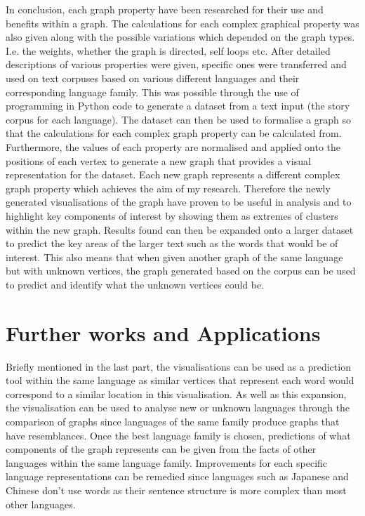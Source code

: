 \noindent In conclusion, each graph property have been researched for their use and benefits within a graph. The calculations for each complex graphical property was also given along with the possible variations which depended on the graph types. I.e. the weights, whether the graph is directed, self loops etc. After detailed descriptions of various properties were given, specific ones were transferred and used on text corpuses based on various different languages and their corresponding language family. This was possible through the use of programming in Python code to generate a dataset from a text input (the story corpus for each language). The dataset can then be used to formalise a graph so that the calculations for each complex graph property can be calculated from. Furthermore, the values of each property are normalised and applied onto the positions of each vertex to generate a new graph that provides a visual representation for the dataset. Each new graph represents a different complex graph property which achieves the aim of my research. Therefore the newly generated visualisations of the graph have proven to be useful in analysis and to highlight key components of interest by showing them as extremes of clusters within the new graph. Results found can then be expanded onto a larger dataset to predict the key areas of the larger text such as the words that would be of interest. This also means that when given another graph of the same language but with unknown vertices, the graph generated based on the corpus can be used to predict and identify what the unknown vertices could be. 

\section{Further works and Applications}
Briefly mentioned in the last part, the visualisations can be used as a prediction tool within the same language as similar vertices that represent each word would correspond to a similar location in this visualisation. As well as this expansion, the visualisation can be used to analyse new or unknown languages through the comparison of graphs since languages of the same family produce graphs that have resemblances. Once the best language family is chosen, predictions of what components of the graph represents can be given from the facts of other languages within the same language family. Improvements for each specific language representations can be remedied since languages such as Japanese and Chinese don't use words as their sentence structure is more complex than most other languages.

